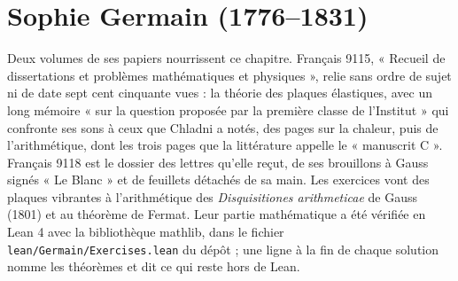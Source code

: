 \documentclass[11pt,a4paper]{article}
\begin{document}
\section*{Sophie Germain (1776--1831)}

Deux volumes de ses papiers nourrissent ce chapitre. Français 9115, « Recueil de
dissertations et problèmes mathématiques et physiques », relie sans ordre de
sujet ni de date sept cent cinquante vues : la théorie des plaques élastiques,
avec un long mémoire « sur la question proposée par la première classe de
l'Institut » qui confronte ses sons à ceux que Chladni a notés, des pages sur la
chaleur, puis de l'arithmétique, dont les trois pages que la littérature appelle
le « manuscrit C ». Français 9118 est le dossier des lettres qu'elle reçut, de ses
brouillons à Gauss signés « Le Blanc » et de feuillets détachés de sa main. Les
exercices vont des plaques vibrantes à l'arithmétique des \emph{Disquisitiones
arithmeticae} de Gauss (1801) et au théorème de Fermat. Leur partie mathématique a
été vérifiée en Lean 4 avec la bibliothèque mathlib, dans le fichier
\texttt{lean/Germain/Exercises.lean} du dépôt ; une ligne à la fin de chaque solution
nomme les théorèmes et dit ce qui reste hors de Lean.
\end{document}

